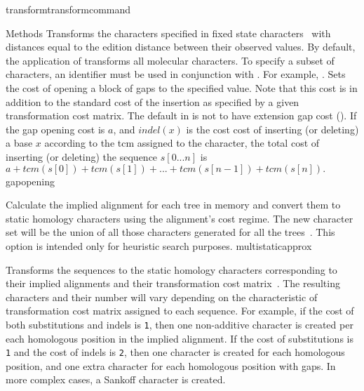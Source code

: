 \begin{command}{transform}{transformcommand}
\begin{arguments}
\begin{argumentgroup}{Methods}
          {Transforms the characters specified in fixed state characters~\cite{wheeler1999a}
          with
          distances equal to the edition distance between their observed values.
          By default, the application of  transforms
          all molecular characters. To specify a subset of characters, an identifier
          must be used in conjunction with . For
          example, .}
          {}
            {Sets the cost of opening a block of gaps to the specified value. Note that
            this cost is in addition to the standard cost of the insertion as
            specified by a given transformation cost matrix.
            The default in \poy is not to have extension
            gap cost (). If the gap
            opening cost is
            $a$, and $indel(x)$ is the cost cost of inserting (or deleting) a
            base $x$ according to the tcm assigned to the character, the total
            cost of inserting (or deleting) the sequence $s[0...n]$ is $a +
            tcm(s[0]) + tcm(s[1]) + ... + tcm(s[n - 1]) + tcm(s[n]).$} 
            {gapopening}

            {Calculate the implied alignment for each tree in memory
            and convert them to static homology characters using the alignment's
            cost regime. The new character set will be the union of all those
            characters generated for all the trees~\cite{wheeler1995a}. This option is intended only
            for heuristic search purposes.}
            {multistaticapprox}
            
            {Transforms the sequences to the static homology characters
            corresponding to their implied alignments and their transformation
            cost matrix~\cite{wheeler2003}. The resulting characters and their number will vary
            depending on the characteristic of transformation cost matrix
            assigned to each sequence. For example, if the cost of both substitutions
            and indels is \texttt{1}, then one non-additive character is created per
            each homologous position in the implied alignment. If the cost of
            substitutions is \texttt{1} and the cost of indels  is \texttt{2}, then
            one character is created for each homologous position, and one extra character for
            each homologous position with gaps. In more complex cases, a Sankoff character is
            created.
            
}
\end{argumentgroup}
\end{arguments}
\end{command}
